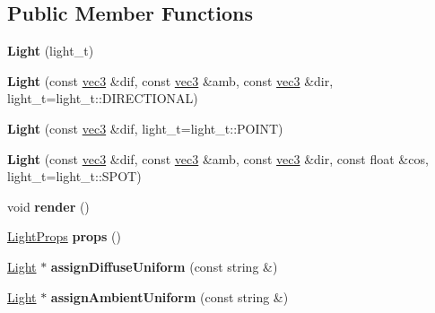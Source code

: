 \subsection*{Public Member Functions}
\begin{DoxyCompactItemize}
\item 
\hypertarget{classj3d_1_1Light_af5b37963a0d57a3e176dcf5b849e8a09}{}{\bfseries Light} (light\+\_\+t)\label{classj3d_1_1Light_af5b37963a0d57a3e176dcf5b849e8a09}

\item 
\hypertarget{classj3d_1_1Light_af0d1cafccae6025092e2535d80cd61de}{}{\bfseries Light} (const \hyperlink{structj3d_1_1vec3}{vec3} \&dif, const \hyperlink{structj3d_1_1vec3}{vec3} \&amb, const \hyperlink{structj3d_1_1vec3}{vec3} \&dir, light\+\_\+t=light\+\_\+t\+::\+D\+I\+R\+E\+C\+T\+I\+O\+N\+A\+L)\label{classj3d_1_1Light_af0d1cafccae6025092e2535d80cd61de}

\item 
\hypertarget{classj3d_1_1Light_a8205a8601d85e7ab03f8ae683d5b4631}{}{\bfseries Light} (const \hyperlink{structj3d_1_1vec3}{vec3} \&dif, light\+\_\+t=light\+\_\+t\+::\+P\+O\+I\+N\+T)\label{classj3d_1_1Light_a8205a8601d85e7ab03f8ae683d5b4631}

\item 
\hypertarget{classj3d_1_1Light_a10659d6178d1661871d2f6bf16c0db58}{}{\bfseries Light} (const \hyperlink{structj3d_1_1vec3}{vec3} \&dif, const \hyperlink{structj3d_1_1vec3}{vec3} \&amb, const \hyperlink{structj3d_1_1vec3}{vec3} \&dir, const float \&cos, light\+\_\+t=light\+\_\+t\+::\+S\+P\+O\+T)\label{classj3d_1_1Light_a10659d6178d1661871d2f6bf16c0db58}

\item 
\hypertarget{classj3d_1_1Light_ad1251abf7fb9c2fa0d15ef4150014601}{}void {\bfseries render} ()\label{classj3d_1_1Light_ad1251abf7fb9c2fa0d15ef4150014601}

\item 
\hypertarget{classj3d_1_1Light_a7e8cbad232eab5175285e37ea0e8003b}{}\hyperlink{structj3d_1_1LightProps}{Light\+Props} {\bfseries props} ()\label{classj3d_1_1Light_a7e8cbad232eab5175285e37ea0e8003b}

\item 
\hypertarget{classj3d_1_1Light_a578264f68d470aac1a1f5c574a001422}{}\hyperlink{classj3d_1_1Light}{Light} $\ast$ {\bfseries assign\+Diffuse\+Uniform} (const string \&)\label{classj3d_1_1Light_a578264f68d470aac1a1f5c574a001422}

\item 
\hypertarget{classj3d_1_1Light_a511fd4cce64253d3e6abea96507a07d1}{}\hyperlink{classj3d_1_1Light}{Light} $\ast$ {\bfseries assign\+Ambient\+Uniform} (const string \&)\label{classj3d_1_1Light_a511fd4cce64253d3e6abea96507a07d1}


\end{DoxyCompactItemize}

